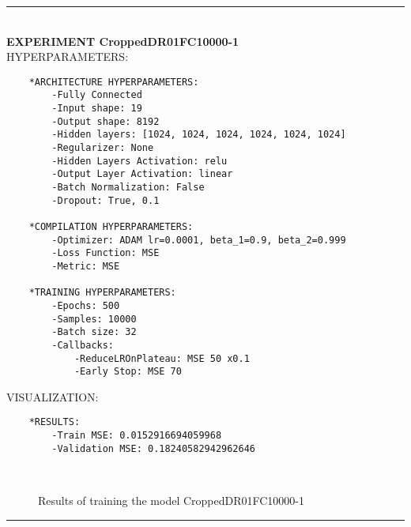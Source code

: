 \rule{0.5\textwidth}{0.5pt}\\

	{\large \textbf{EXPERIMENT CroppedDR01FC10000-1}}\\
	
	{\normalsize HYPERPARAMETERS:}
	\begin{lstlisting}	
	*ARCHITECTURE HYPERPARAMETERS:
		-Fully Connected
		-Input shape: 19
		-Output shape: 8192
		-Hidden layers: [1024, 1024, 1024, 1024, 1024, 1024]
		-Regularizer: None
		-Hidden Layers Activation: relu
		-Output Layer Activation: linear
		-Batch Normalization: False
		-Dropout: True, 0.1
	
	*COMPILATION HYPERPARAMETERS:
		-Optimizer: ADAM lr=0.0001, beta_1=0.9, beta_2=0.999
		-Loss Function: MSE
		-Metric: MSE
	
	*TRAINING HYPERPARAMETERS:
		-Epochs: 500
		-Samples: 10000
		-Batch size: 32
		-Callbacks: 
			-ReduceLROnPlateau: MSE 50 x0.1
			-Early Stop: MSE 70
	\end{lstlisting}
	
	{\normalsize VISUALIZATION:}
	\begin{lstlisting}
	*RESULTS:
        -Train MSE: 0.0152916694059968
        -Validation MSE: 0.18240582942962646
	\end{lstlisting}
	
	\begin{figure*}[ht!]
		\hspace{\fill}
		\hspace{\fill}
		\\
		\caption{Results of training the model CroppedDR01FC10000-1}
	\end{figure*}
	
\FloatBarrier	
\rule{0.5\textwidth}{0.5pt}\\